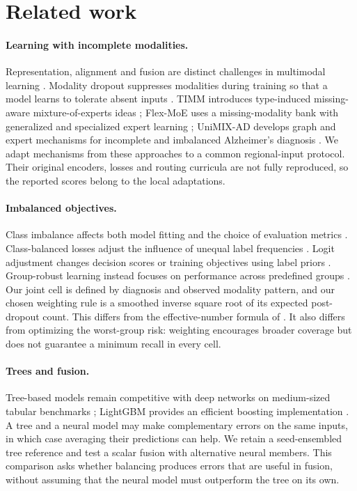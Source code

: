 \section{Related work}
\paragraph{Learning with incomplete modalities.}
Representation, alignment and fusion are distinct challenges in multimodal learning \citep{baltrusaitis2019multimodal}. Modality dropout suppresses modalities during training so that a model learns to tolerate absent inputs \citep{neverova2016moddrop}. TIMM introduces type-induced missing-aware mixture-of-experts ideas \citep{qian2025timm}; Flex-MoE uses a missing-modality bank with generalized and specialized expert learning \citep{yun2024flexmoe}; UniMIX-AD develops graph and expert mechanisms for incomplete and imbalanced Alzheimer's diagnosis \citep{yang2026unimix}. We adapt mechanisms from these approaches to a common regional-input protocol. Their original encoders, losses and routing curricula are not fully reproduced, so the reported scores belong to the local adaptations.

\paragraph{Imbalanced objectives.}
Class imbalance affects both model fitting and the choice of evaluation metrics \citep{he2009imbalanced}. Class-balanced losses adjust the influence of unequal label frequencies \citep{cui2019classbalanced}. Logit adjustment changes decision scores or training objectives using label priors \citep{menon2021longtail}. Group-robust learning instead focuses on performance across predefined groups \citep{sagawa2020distributionally}. Our joint cell is defined by diagnosis and observed modality pattern, and our chosen weighting rule is a smoothed inverse square root of its expected post-dropout count. This differs from the effective-number formula of \citet{cui2019classbalanced}. It also differs from optimizing the worst-group risk: weighting encourages broader coverage but does not guarantee a minimum recall in every cell.

\paragraph{Trees and fusion.}
Tree-based models remain competitive with deep networks on medium-sized tabular benchmarks \citep{grinsztajn2022trees}; LightGBM provides an efficient boosting implementation \citep{ke2017lightgbm}. A tree and a neural model may make complementary errors on the same inputs, in which case averaging their predictions can help. We retain a seed-ensembled tree reference and test a scalar fusion with alternative neural members. This comparison asks whether balancing produces errors that are useful in fusion, without assuming that the neural model must outperform the tree on its own.
